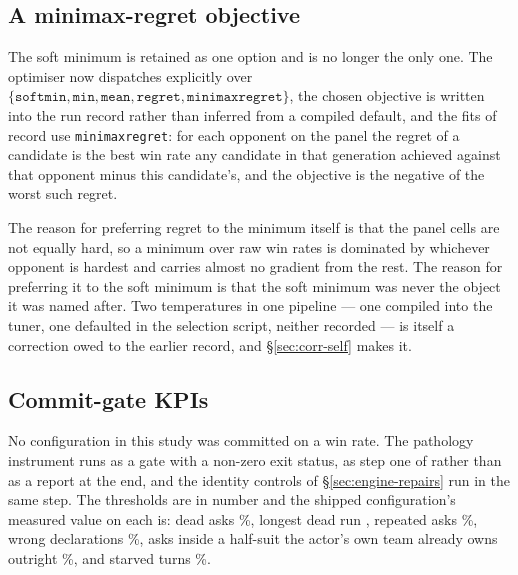\subsection{A minimax-regret objective}
\label{sec:fit-objective}

The soft minimum is retained as one option and is no longer the only one. The
optimiser now dispatches explicitly over $\{\texttt{softmin}, \texttt{min},
\texttt{mean}, \texttt{regret}, \texttt{minimaxregret}\}$, the chosen objective
is written into the run record rather than inferred from a compiled default, and
the fits of record use \texttt{minimaxregret}: for each opponent on the panel the
regret of a candidate is the best win rate any candidate in that generation
achieved against that opponent minus this candidate's, and the objective is the
negative of the worst such regret.

The reason for preferring regret to the minimum itself is that the panel cells
are not equally hard, so a minimum over raw win rates is dominated by whichever
opponent is hardest and carries almost no gradient from the rest. The reason for
preferring it to the soft minimum is that the soft minimum was never the object
it was named after. Two temperatures in one pipeline --- one compiled into the
tuner, one defaulted in the selection script, neither recorded --- is itself a
correction owed to the earlier record, and \S\ref{sec:corr-self} makes it.

\subsection{Commit-gate KPIs}
\label{sec:fit-gates}

No configuration in this study was committed on a win rate. The pathology
instrument runs as a gate with a non-zero exit status, as step one of
 rather than as a report at the end, and the
identity controls of \S\ref{sec:engine-repairs} run in the same step. The
thresholds are \vsixGateN{} in number and the shipped configuration's measured
value on each is: dead asks \vsixGateDeadAsk{}\%, longest dead run
\vsixGateDeadRun{}, repeated asks \vsixGateRepeatAsk{}\%, wrong declarations
\vsixGateDeclWrong{}\%, asks inside a half-suit the actor's own team already owns
outright \vsixGateOwnLocked{}\%, and starved turns \vsixGateStarved{}\%.

